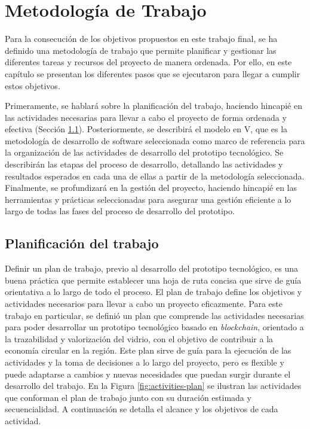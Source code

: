 \chapter[Metodología de trabajo]{Metodología de Trabajo}
\label{cp:methodology}

\parindent0pt

Para la consecución de los objetivos propuestos en este trabajo final, se ha definido una metodología de trabajo que permite planificar y gestionar las diferentes tareas y recursos del proyecto de manera ordenada. Por ello, en este capítulo se presentan los diferentes pasos que se ejecutaron para llegar a cumplir estos objetivos. 

Primeramente, se hablará sobre la planificación del trabajo, haciendo hincapié en las actividades necesarias para llevar a cabo el proyecto de forma ordenada y efectiva (Sección \ref{sec:work-plan}). Posteriormente, se describirá el modelo en V, que es la metodología de desarrollo de software seleccionada como marco de referencia para la organización de las actividades de desarrollo del prototipo tecnológico. Se describirán las etapas del proceso de desarrollo, detallando las actividades y resultados esperados en cada una de ellas a partir de la metodología seleccionada. Finalmente, se profundizará en la gestión del proyecto, haciendo hincapié en las herramientas y prácticas seleccionadas para asegurar una gestión eficiente a lo largo de todas las fases del proceso de desarrollo del prototipo.

\section{Planificación del trabajo}
\label{sec:work-plan}

Definir un plan de trabajo, previo al desarrollo del prototipo tecnológico, es una buena práctica que permite establecer una hoja de ruta concisa que sirve de guía orientativa a lo largo de todo el proceso. El plan de trabajo define los objetivos y actividades necesarios para llevar a cabo un proyecto eficazmente. Para este trabajo en particular, se definió un plan que comprende las actividades necesarias para poder desarrollar un prototipo tecnológico basado en \textit{blockchain}, orientado a la trazabilidad y valorización del vidrio, con el objetivo de contribuir a la economía circular en la región. Este plan sirve de guía para la ejecución de las actividades y la toma de decisiones a lo largo del proyecto, pero es flexible y puede adaptarse a cambios y nuevas necesidades que puedan surgir durante el desarrollo del trabajo. En la Figura \ref{fig:activities-plan} se ilustran las actividades que conforman el plan de trabajo junto con su duración estimada y secuencialidad. A continuación se detalla el alcance y los objetivos de cada actividad.

